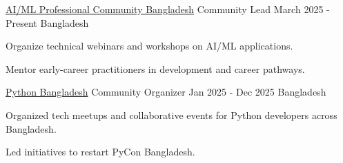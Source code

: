 


\begin{cventries}
\cventry
    {\href{https://aimlcommunity.pythonbd.org/}{AI/ML Professional Community Bangladesh}} %
    {Community Lead} %
    {March 2025 - Present} %
    {Bangladesh} %
    {
      \begin{cvitems} %
        \item{Organize technical webinars and workshops on AI/ML applications.}
        \item{Mentor early-career practitioners in development and career pathways.}
      \end{cvitems}
    }

  \cventry
    {\href{https://pythonbd.org/}{Python Bangladesh}} %
    {Community Organizer} %
    {Jan 2025 - Dec 2025} %
    {Bangladesh} %
    {
      \begin{cvitems} %
        \item{Organized tech meetups and collaborative events for Python developers across Bangladesh.}
        \item{Led initiatives to restart PyCon Bangladesh.}
      \end{cvitems}
    }



\end{cventries}
